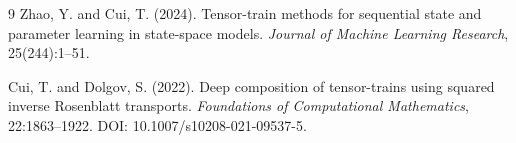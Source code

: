\documentclass[11pt]{article}
\renewcommand{\[}{\begin{equation}}
\renewcommand{\]}{\end{equation}}
\theoremstyle{definition}
\theoremstyle{remark}
\begin{document}
\begin{thebibliography}{9}
Zhao, Y. and Cui, T. (2024).
\newblock Tensor-train methods for sequential state and parameter learning in
state-space models.
\newblock \emph{Journal of Machine Learning Research}, 25(244):1--51.

Cui, T. and Dolgov, S. (2022).
\newblock Deep composition of tensor-trains using squared inverse Rosenblatt
transports.
\newblock \emph{Foundations of Computational Mathematics}, 22:1863--1922.
\newblock DOI: 10.1007/s10208-021-09537-5.
\end{thebibliography}
\end{document}
